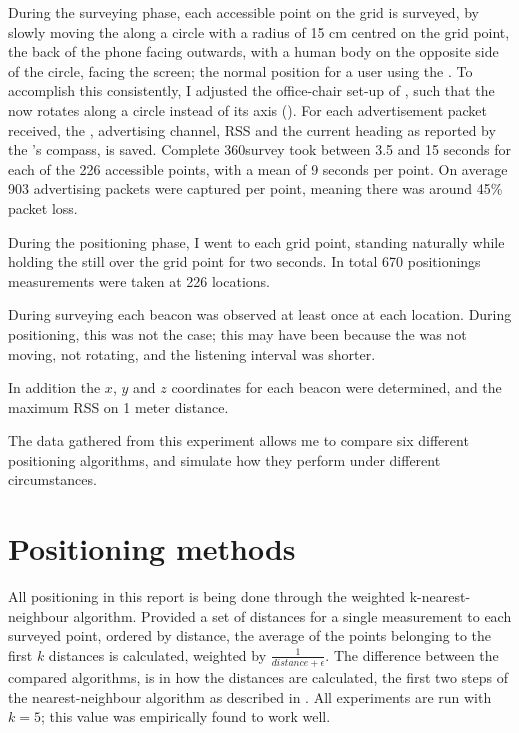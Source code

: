 During the surveying phase, each accessible point on the grid is surveyed, by slowly moving the \device along a circle with a radius of 15 cm centred on the grid point, the back of the phone facing outwards, with a human body on the opposite side of the circle, facing the screen; the normal position for a user using the \device.
To accomplish this consistently, I adjusted the office-chair set-up of , such that the \device now rotates along a circle instead of its axis ().
For each advertisement packet received, the \bid, advertising channel, RSS and the current heading as reported by the \device's compass, is saved.
Complete 360\tdegree survey took between 3.5 and 15 seconds for each of the 226 accessible points, with a mean of 9 seconds per point.
On average 903 advertising packets were captured per point, meaning there was around 45\% packet loss.

During the positioning phase, I went to each grid point, standing naturally while holding the \device still over the grid point for two seconds.
In total 670 positionings measurements were taken at 226 locations.

During surveying each beacon was observed at least once at each location.
During positioning, this was not the case; this may have been because the \device was not moving, not rotating, and the listening interval was shorter.

In addition the $x$, $y$ and $z$ coordinates for each beacon were determined, and the maximum RSS on 1 meter distance.

The data gathered from this experiment allows me to compare six different positioning algorithms, and simulate how they perform under different circumstances.

\section{Positioning methods}

All positioning in this report is being done through the weighted k-nearest-neighbour algorithm.
Provided a set of distances for a single measurement to each surveyed point, ordered by distance, the average of the points belonging to the first $k$ distances is calculated, weighted by $\frac{1}{distance+\epsilon}$.
The difference between the compared algorithms, is in how the distances are calculated, the first two steps of the nearest-neighbour algorithm as described in .
All experiments are run with $k = 5$; this value was empirically found to work well.

